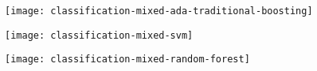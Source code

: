 %
\begin{frame}

  \begin{figure}
    \texttt{[image: classification-mixed-ada-traditional-boosting]}
  \end{figure}
  
\end{frame}
%
\begin{frame}

  \begin{figure}
    \texttt{[image: classification-mixed-svm]}
  \end{figure}
  
\end{frame}
%
\begin{frame}

  \begin{figure}
    \texttt{[image: classification-mixed-random-forest]}
  \end{figure}
  
\end{frame}